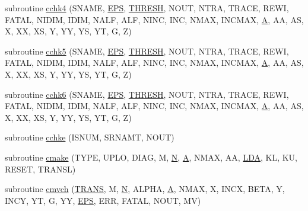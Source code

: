\begin{DoxyCompactItemize}
\item 
subroutine \hyperlink{cblat2_8f_a3b982cf3b49b7f329f4d3f9c2c671739}{cchk4} (S\+N\+A\+M\+E, \hyperlink{tukey_8c_a6ebf6899d6c1c8b7b9d09be872c05aae}{E\+P\+S}, \hyperlink{zlaqgs_8c_a0656018abfc9fa2821827415f5d5ea57}{T\+H\+R\+E\+S\+H}, N\+O\+U\+T, N\+T\+R\+A, T\+R\+A\+C\+E, R\+E\+W\+I, F\+A\+T\+A\+L, N\+I\+D\+I\+M, I\+D\+I\+M, N\+A\+L\+F, A\+L\+F, N\+I\+N\+C, I\+N\+C, N\+M\+A\+X, I\+N\+C\+M\+A\+X, \hyperlink{classA}{A}, A\+A, A\+S, X, X\+X, X\+S, Y, Y\+Y, Y\+S, Y\+T, G, Z)
\item 
subroutine \hyperlink{cblat2_8f_ab31bfa0d54c114ee36424a8e43f61b1f}{cchk5} (S\+N\+A\+M\+E, \hyperlink{tukey_8c_a6ebf6899d6c1c8b7b9d09be872c05aae}{E\+P\+S}, \hyperlink{zlaqgs_8c_a0656018abfc9fa2821827415f5d5ea57}{T\+H\+R\+E\+S\+H}, N\+O\+U\+T, N\+T\+R\+A, T\+R\+A\+C\+E, R\+E\+W\+I, F\+A\+T\+A\+L, N\+I\+D\+I\+M, I\+D\+I\+M, N\+A\+L\+F, A\+L\+F, N\+I\+N\+C, I\+N\+C, N\+M\+A\+X, I\+N\+C\+M\+A\+X, \hyperlink{classA}{A}, A\+A, A\+S, X, X\+X, X\+S, Y, Y\+Y, Y\+S, Y\+T, G, Z)
\item 
subroutine \hyperlink{cblat2_8f_a81d3347a7c5b9f9cd1ac875af0022ab3}{cchk6} (S\+N\+A\+M\+E, \hyperlink{tukey_8c_a6ebf6899d6c1c8b7b9d09be872c05aae}{E\+P\+S}, \hyperlink{zlaqgs_8c_a0656018abfc9fa2821827415f5d5ea57}{T\+H\+R\+E\+S\+H}, N\+O\+U\+T, N\+T\+R\+A, T\+R\+A\+C\+E, R\+E\+W\+I, F\+A\+T\+A\+L, N\+I\+D\+I\+M, I\+D\+I\+M, N\+A\+L\+F, A\+L\+F, N\+I\+N\+C, I\+N\+C, N\+M\+A\+X, I\+N\+C\+M\+A\+X, \hyperlink{classA}{A}, A\+A, A\+S, X, X\+X, X\+S, Y, Y\+Y, Y\+S, Y\+T, G, Z)
\item 
subroutine \hyperlink{cblat2_8f_a442921d6b8d50c2e886d7a6c7fff3657}{cchke} (I\+S\+N\+U\+M, S\+R\+N\+A\+M\+T, N\+O\+U\+T)
\item 
subroutine \hyperlink{cblat2_8f_a0abb9fcb91316270032dcb08c0b1dc21}{cmake} (T\+Y\+P\+E, U\+P\+L\+O, D\+I\+A\+G, M, \hyperlink{polmisc_8c_a0240ac851181b84ac374872dc5434ee4}{N}, \hyperlink{classA}{A}, N\+M\+A\+X, A\+A, \hyperlink{example__user_8c_ae946da542ce0db94dced19b2ecefd1aa}{L\+D\+A}, K\+L, K\+U, R\+E\+S\+E\+T, T\+R\+A\+N\+S\+L)
\item 
subroutine \hyperlink{cblat2_8f_ab837b3979a55d08c93070afd6eed031b}{cmvch} (\hyperlink{superlu__enum__consts_8h_a0c4e17b2d5cea33f9991ccc6a6678d62a1f61e3015bfe0f0c2c3fda4c5a0cdf58}{T\+R\+A\+N\+S}, M, \hyperlink{polmisc_8c_a0240ac851181b84ac374872dc5434ee4}{N}, A\+L\+P\+H\+A, \hyperlink{classA}{A}, N\+M\+A\+X, X, I\+N\+C\+X, B\+E\+T\+A, Y, I\+N\+C\+Y, Y\+T, G, Y\+Y, \hyperlink{tukey_8c_a6ebf6899d6c1c8b7b9d09be872c05aae}{E\+P\+S}, E\+R\+R, F\+A\+T\+A\+L, N\+O\+U\+T, M\+V)

\end{DoxyCompactItemize}
